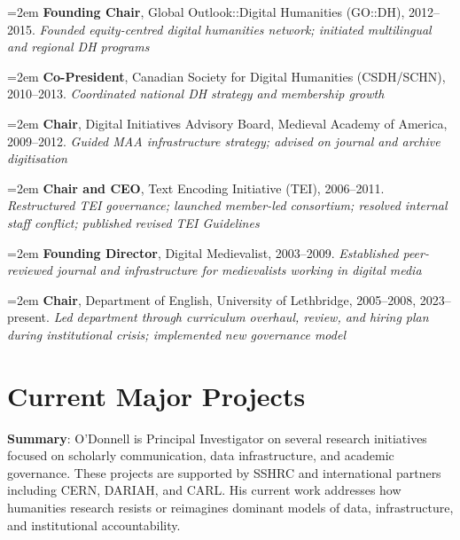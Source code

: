 \documentclass[12pt]{article}
\begin{document}
{\vspace{0.5em}
\hangindent=2em
\noindent
\textbf{Founding Chair}, Global Outlook::Digital Humanities (GO::DH), 2012–2015. \textit{Founded equity-centred digital humanities network; initiated multilingual and regional DH programs}

\vspace{0.5em}
\hangindent=2em
\noindent
\textbf{Co-President}, Canadian Society for Digital Humanities (CSDH/SCHN), 2010–2013. \textit{Coordinated national DH strategy and membership growth}

\vspace{0.5em}
\hangindent=2em
\noindent
\textbf{Chair}, Digital Initiatives Advisory Board, Medieval Academy of America, 2009–2012. \textit{Guided MAA infrastructure strategy; advised on journal and archive digitisation}

\vspace{0.5em}
\hangindent=2em
\noindent
\textbf{Chair and CEO}, Text Encoding Initiative (TEI), 2006–2011. \textit{Restructured TEI governance; launched member-led consortium; resolved internal staff conflict; published revised TEI Guidelines}

\vspace{0.5em}
\hangindent=2em
\noindent
\textbf{Founding Director}, Digital Medievalist, 2003–2009. \textit{Established peer-reviewed journal and infrastructure for medievalists working in digital media}

\vspace{0.5em}
\hangindent=2em
\noindent
\textbf{Chair}, Department of English, University of Lethbridge, 2005–2008, 2023–present. \textit{Led department through curriculum overhaul, review, and hiring plan during institutional crisis; implemented new governance model}

}

\section*{Current Major Projects}

\textbf{Summary}: O'Donnell is Principal Investigator on several research initiatives focused on scholarly communication, data infrastructure, and academic governance. These projects are supported by SSHRC and international partners including CERN, DARIAH, and CARL. His current work addresses how humanities research resists or reimagines dominant models of data, infrastructure, and institutional accountability.
\end{document}
